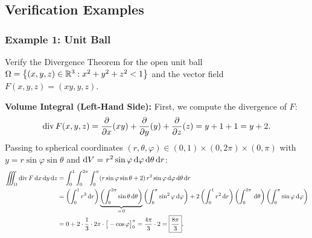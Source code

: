 \subsection{Verification Examples}

\subsubsection{Example 1: Unit Ball}

\begin{exemple}
Verify the Divergence Theorem for the open unit ball $\Omega = \left\{(x,y,z) \in \mathbb{R}^3 : x^2 + y^2 + z^2 < 1\right\}$ and the vector field $F(x,y,z) = (xy, y, z)$.

\smallskip
\noindent\textbf{Volume Integral (Left-Hand Side):} First, we compute the divergence of $F$:
\[
    \operatorname{div} F(x,y,z) = \pdv{}{x}(xy) + \pdv{}{y}(y) + \pdv{}{z}(z) = y + 1 + 1 = y + 2.
\]
Passing to spherical coordinates $(r, \theta, \varphi) \in (0,1) \times (0,2\pi) \times (0,\pi)$ with $y = r \sin\varphi \sin\theta$ and $\mathrm{d} V = r^2 \sin\varphi \,\mathrm{d}\varphi \,\mathrm{d}\theta \,\mathrm{d}r$:
\begin{align*}
    \iiint_{\Omega} \operatorname{div} F \,\mathrm{d}x\,\mathrm{d}y\,\mathrm{d}z &= \int_{0}^{1} \int_{0}^{2\pi} \int_{0}^{\pi} (r \sin\varphi \sin\theta + 2) \, r^2 \sin\varphi \,\mathrm{d}\varphi \,\mathrm{d}\theta \,\mathrm{d}r \\
    &= \left( \int_{0}^{1} r^3 \,\mathrm{d}r \right) \underbrace{\left( \int_{0}^{2\pi} \sin\theta \,\mathrm{d}\theta \right)}_{=\,0} \left( \int_{0}^{\pi} \sin^2\varphi \,\mathrm{d}\varphi \right) + 2 \left( \int_{0}^{1} r^2 \,\mathrm{d}r \right) \left( \int_{0}^{2\pi} \,\mathrm{d}\theta \right) \left( \int_{0}^{\pi} \sin\varphi \,\mathrm{d}\varphi \right) \\
    &= 0 + 2 \cdot \frac{1}{3} \cdot 2\pi \cdot \big[ -\cos\varphi \big]_{0}^{\pi} = \frac{4\pi}{3} \cdot 2 = \boxed{\frac{8\pi}{3}}.
\end{align*}
\end{exemple}


